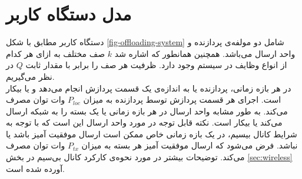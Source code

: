\section{مدل دستگاه کاربر}
\label{sec:ue-model}
دستگاه کاربر مطابق با شکل \ref{fig-offloading-system} شامل دو مولفه‌ی پردازنده و واحد ارسال می‌باشد. همچنین همانطور که اشاره شد \(k\) صف مختلف به ازای هر کدام از انواع وظایف در سیستم وجود دارد. ظرفیت هر صف را برابر با مقدار ثابت \(Q\) در نظر می‌گیریم. \\

در هر بازه زمانی، پردازنده یا به اندازه‌ی یک قسمت پردازش انجام می‌دهد و یا بیکار است. اجرای هر قسمت پردازش توسط پردازنده به میزان
\(P_{l o c}\)
وات توان مصرف می‌کند. به طور مشابه واحد ارسال در هر بازه زمانی یا یک بسته را به شبکه ارسال می‌کند یا بیکار است. نکته قابل توجه در مورد واحد ارسال این است که با توجه به شرایط کانال بیسیم، در یک بازه زمانی خاص ممکن است ارسال موفقیت آمیز باشد یا نباشد. فرض می‌شود که ارسال موفقیت آمیز هر بسته به میزان
\(P_{t x}\)
وات توان مصرف می‌کند. توضیحات بیشتر در مورد نحوه‌ی کارکرد کانال بی‌سیم در بخش \ref{sec:wireless} آورده شده است. \\

